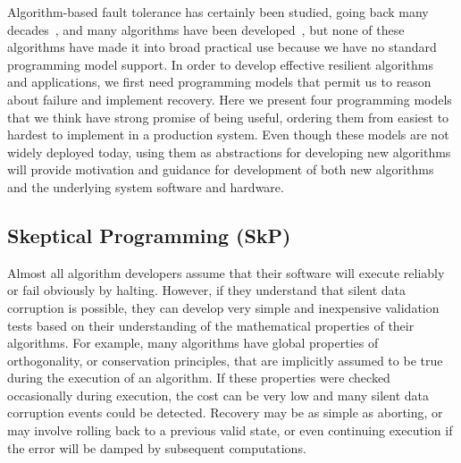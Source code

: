 \documentclass[10pt, twocolumn]{IEEEtran}
\begin{document}
Algorithm-based fault tolerance has certainly been studied, going back many decades~\cite{huang1984algorithm}, and many algorithms have been developed~\cite{Reis:2005:SSI:1048922.1048991,Langou:2007:RPI:1350656.1350657,Wilfredo:2000:SFT:886626,Yang:2007:FTP:1299042.1299048}, but none of these algorithms have made it into broad practical use because we have no standard programming model support.  In order to develop effective resilient algorithms and applications, we first need programming models that permit us to reason about failure and implement recovery.  Here we present four programming models that we think have strong promise of being useful, ordering them from easiest to hardest to implement in a production system.  Even though these models are not widely deployed today, using them as abstractions for developing new algorithms will provide motivation and guidance for development of both new algorithms and the underlying system software and hardware.

\flushleft{}  
\subsection{Skeptical Programming (SkP)}
Almost all algorithm developers assume that their software will execute reliably or fail obviously by halting.  However, if they understand that silent data corruption is possible, they can develop very simple and inexpensive validation tests based on their understanding of the mathematical properties of their algorithms.  For example, many algorithms have global properties of orthogonality, or conservation principles, that are implicitly assumed to be true during the execution of an algorithm.  If these properties were checked occasionally during execution, the cost can be very low and many silent data corruption events could be detected.  Recovery may be as simple as aborting, or may involve rolling back to a previous valid state, or even continuing execution if the error will be damped by subsequent computations.
\end{document}
